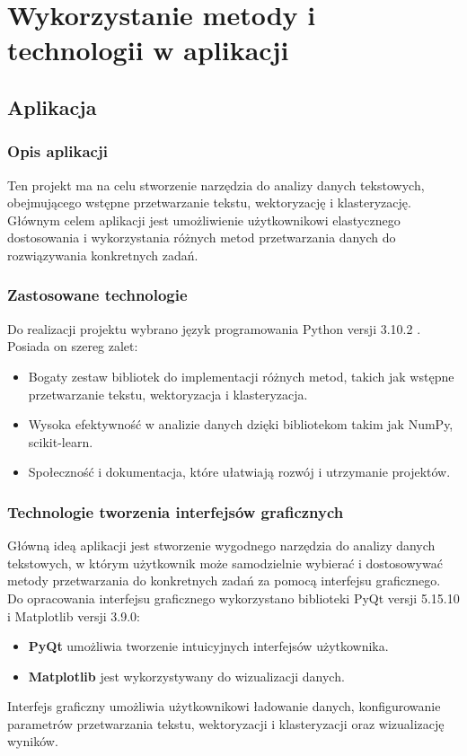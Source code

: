 \chapter{Wykorzystanie metody i technologii w aplikacji}
	
		
\section{Aplikacja}

	\subsection{Opis aplikacji}
		Ten projekt ma na celu stworzenie narzędzia do analizy danych tekstowych, obejmującego wstępne przetwarzanie tekstu, wektoryzację i klasteryzację. Głównym celem aplikacji jest umożliwienie użytkownikowi elastycznego dostosowania i wykorzystania różnych metod przetwarzania danych do rozwiązywania konkretnych zadań.
		
		
	\subsection{Zastosowane technologie}
		Do realizacji projektu wybrano język programowania Python versji 3.10.2 . Posiada on szereg zalet:
		\begin{itemize}
			\item Bogaty zestaw bibliotek do implementacji różnych metod, takich jak wstępne przetwarzanie tekstu, wektoryzacja i klasteryzacja.
			\item Wysoka efektywność w analizie danych dzięki bibliotekom takim jak NumPy, scikit-learn.
			\item Społeczność i dokumentacja, które ułatwiają rozwój i utrzymanie projektów.
		\end{itemize}
		
		
	\subsection{Technologie tworzenia interfejsów graficznych}
		Główną ideą aplikacji jest stworzenie wygodnego narzędzia do analizy danych tekstowych, w którym użytkownik może samodzielnie wybierać i dostosowywać metody przetwarzania do konkretnych zadań za pomocą interfejsu graficznego. Do opracowania interfejsu graficznego wykorzystano biblioteki PyQt versji 5.15.10 i Matplotlib versji 3.9.0:
		\begin{itemize}
			\item \textbf{PyQt} umożliwia tworzenie intuicyjnych interfejsów użytkownika.
			\item \textbf{Matplotlib} jest wykorzystywany do wizualizacji danych.
		\end{itemize}
		Interfejs graficzny umożliwia użytkownikowi ładowanie danych, konfigurowanie parametrów przetwarzania tekstu, wektoryzacji i klasteryzacji oraz wizualizację wyników.
		
